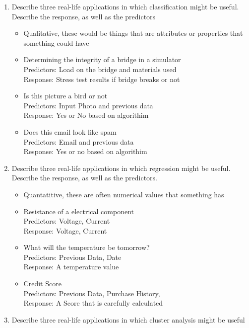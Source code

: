 \documentclass[11pt]{article}
\newcommand\tab[1][1cm]{\hspace*{#1}}
\begin{document}
\begin{enumerate}[label=(\alph*)]
    \item Describe three real-life applications in which classification might be useful. Describe the response, as well as the predictors
          \begin{itemize}
              \item Qualitative, these would be things that are attributes or properties that something could have
              \item Determining the integrity of a bridge in a simulator \\\tab Predictors: Load on the bridge and materials used \\\tab Response: Stress test results if bridge breaks or not
              \item Is this picture a bird or not \\\tab Predictors: Input Photo and previous data\\\tab Response: Yes or No based on algorithim
              \item Does this email look like spam \\\tab Predictors: Email and previous data\\\tab Response: Yes or no based on algorithim
          \end{itemize}
    \item Describe three real-life applications in which regression might be useful. Describe the response, as well as the predictors.
          \begin{itemize}
              \item Quantatitive, these are often numerical values that something has
              \item Resistance of a electrical component \\\tab Predictors: Voltage, Current \\\tab Response: Voltage, Current
              \item What will the temperature be tomorrow? \\\tab Predictors: Previous Data, Date\\\tab Response: A temperature value
              \item Credit Score\\\tab Predictors: Previous Data, Purchase History, \\\tab Response: A Score that is carefully calculated
          \end{itemize}
    \item Describe three real-life applications in which cluster analysis might be useful

\end{enumerate}
\end{document}
